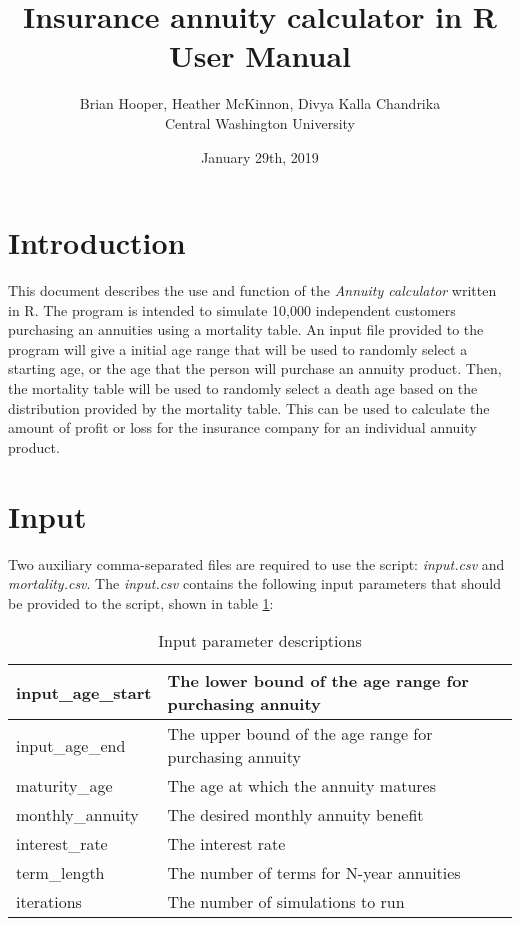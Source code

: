 \documentclass[12pt]{article}
\title{\textbf{Insurance annuity calculator in R} \\ User Manual}
\author{Brian Hooper, Heather McKinnon, Divya Kalla Chandrika  \\ Central Washington University}
\date{January 29th, 2019}
\begin{document}
	\maketitle
	
	\section{Introduction}
	This document describes the use and function of the \textit{Annuity calculator} written in R. The program is intended to simulate 10,000 independent customers purchasing an annuities using a mortality table. An input file provided to the program will give a initial age range that will be used to randomly select a starting age, or the age that the person will purchase an annuity product. Then, the mortality table will be used to randomly select a death age based on the distribution provided by the mortality table. This can be used to calculate the amount of profit or loss for the insurance company for an individual annuity product.
	
	\section{Input}
	Two auxiliary comma-separated files are required to use the script: \textit{input.csv} and \textit{mortality.csv}. The \textit{input.csv} contains the following input parameters that should be provided to the script, shown in table \ref{description}: 
\begin{table}[H]
	\centering
	\begin{tabular}{|l|l|}
		\hline
		input\_age\_start & The lower bound of the age range for purchasing annuity \\ \hline
		input\_age\_end & The upper bound of the age range for purchasing annuity \\ \hline
		maturity\_age & The age at which the annuity matures \\ \hline
		monthly\_annuity & The desired monthly annuity benefit \\ \hline
		interest\_rate & The interest rate \\ \hline
		term\_length & The number of terms for N-year annuities \\ \hline
		iterations & The number of simulations to run \\ \hline
	\end{tabular}
	\label{description}
	\caption{Input parameter descriptions}
\end{table}
\end{document}
